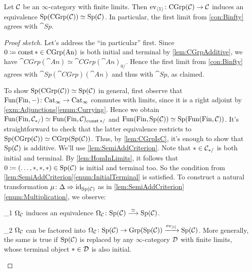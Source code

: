 \begin{lem}\label{lem:SpCGrpIsSp}
	Let $\mathcal{C}$ be an $\infty$-category with finite limits. Then $\operatorname{ev}_{\langle 1\rangle}\colon \mathrm{CGrp}(\mathcal{C})\rightarrow \mathcal{C}$ induces an equivalence $\mathrm{Sp}(\mathrm{CGrp}(\mathcal{C}))\simeq \mathrm{Sp}(\mathcal{C})$. In particular, the first limit from \cref{con:Binfty} agrees with $\cat{Sp}$.
\end{lem}
\begin{proof}[Proof sketch]
	Let's address the \enquote{in particular} first. Since $0\coloneqq \operatorname{const} *\in\mathrm{CGrp}(\mathrm{An})$ is both initial and terminal by \cref{lem:CGrpAdditive}, we have $\cat{CGrp}(\cat{An})\simeq \cat{CGrp}(\cat{An})_{0/}$. Hence the first limit from \cref{con:Binfty} agrees with $\cat{Sp}(\cat{CGrp})(\cat{An})$ and thus with $\cat{Sp}$, as claimed.
	
	To show $\mathrm{Sp}(\mathrm{CGrp}(\mathcal{C}))\simeq \mathrm{Sp}(\mathcal{C})$ in general, first observe that $\operatorname{Fun}(\mathrm{Fin},-)\colon \mathrm{Cat}_\infty\rightarrow \mathrm{Cat}_\infty$ commutes with limits, since it is a right adjoint by \cref{exm:Adjunctions}\cref{enum:Currying}. Hence we obtain $\operatorname{Fun}(\mathrm{Fin},\mathcal{C}_{*/})\simeq \operatorname{Fun}(\mathrm{Fin},\mathcal{C})_{\operatorname{const} */}$ and  $\operatorname{Fun}(\mathrm{Fin},\mathrm{Sp}(\mathcal{C}))\simeq \mathrm{Sp}(\operatorname{Fun}(\mathrm{Fin},\mathcal{C}))$. It's straightforward to check that the latter equivalence restricts to $\mathrm{Sp}(\mathrm{CGrp}(\mathcal{C}))\simeq \mathrm{CGrp}(\mathrm{Sp}(\mathcal{C}))$. Thus, by \cref{lem:CGrpIsC}, it's enough to show that $\mathrm{Sp}(\mathcal{C})$ is additive. We'll use \cref{lem:SemiAddCriterion}. Note that $*\in\mathcal{C}_{*/}$ is both initial and terminal. By \cref{lem:HomInLimits}, it follows that $0\coloneqq (\dotsc,*,*,*)\in \mathrm{Sp}(\mathcal{C})$ is initial and terminal too. So the condition from \cref{lem:SemiAddCriterion}\cref{enum:InitialTerminal} is satisfied. To construct a natural transformation $\mu\colon \Delta\Rightarrow \operatorname{id}_{\mathrm{Sp}(\mathcal{C})}$ as in \cref{lem:SemiAddCriterion}\cref{enum:Multiplication}, we observe:
	\begin{alphanumerate}\itshape
		\item[\boxtimes_1] $\Omega_{\mathcal{C}}$ induces an equivalence $\Omega_{\mathcal{C}}\colon \mathrm{Sp}(\mathcal{C})\overset{\simeq}{\longrightarrow}\mathrm{Sp}(\mathcal{C})$.\label{claim:OmegaEquivalence}
		\item[\boxtimes_2] $\Omega_{\mathcal{C}}$ can be factored into $\Omega_{\mathcal{C}}\colon\mathrm{Sp}(\mathcal{C})\rightarrow \mathrm{Grp}(\mathrm{Sp}(\mathcal{C}))\xrightarrow{\operatorname{ev}_{[1]}}\mathrm{Sp}(\mathcal{C})$. More generally, the same is true if $\mathrm{Sp}(\mathcal{C})$ is replaced by any $\infty$-category $\mathcal{D}$ with finite limits, whose terminal object $*\in\mathcal{D}$ is also initial.\label{claim:OmegaGrp}

\end{alphanumerate}
\end{proof}
